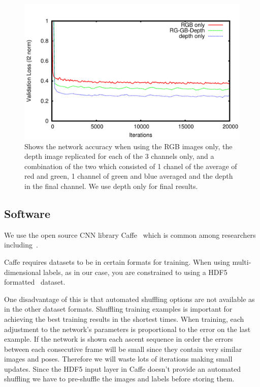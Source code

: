 \documentclass[11pt]{article} %
\begin{document}
\begin{figure}
\centering
\includegraphics*[width=0.8\linewidth,clip]{rgbComp.pdf} %
\caption{Shows the network accuracy when using the RGB images only, the depth image replicated for each of the 3 channels only, and a combination of the two which consisted of 1 chanel of the average of red and green, 1 channel of green and blue averaged and the depth in the final channel. We use depth only for final results. }
\label{fig:rgbdcomp}
\end{figure}





\subsection{Software}

We use the open source CNN library Caffe~\cite{Jia2014} which is common among researchers including~\cite{Chen, Pfister,Girshick2014,Springenberg2015,Schwarz2015,Simonyan2015,Wang2015}. 

Caffe requires datasets to be in certain formats for training. When using multi-dimensional labels, as in our case, you are constrained to using a HDF5 formatted~\cite{Folk2011} dataset. 

One disadvantage of this is that automated shuffling options are not available as in the other dataset formats. Shuffling training examples is important for achieving the best training results in the shortest times. When training, each adjustment to the network's parameters is proportional to the error on the last example. If the network is shown each ascent sequence in order the errors between each consecutive frame will be small since they contain very similar images and poses. Therefore we will waste lots of iterations making small updates. Since the HDF5 input layer in Caffe doesn't provide an automated shuffling we have to pre-shuffle the images and labels before storing them.
\end{document}
